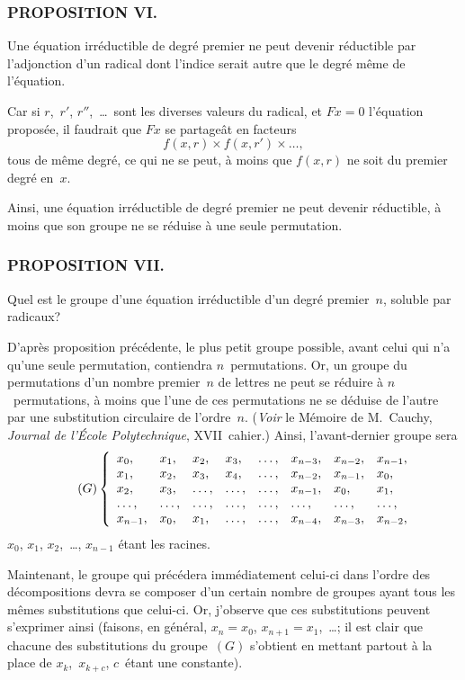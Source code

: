 \documentclass[leqno,12pt]{book}[2005/09/16]
\newcommand{\Subsection}[1]{\subsubsection*{\centering\small\normalfont #1}}
\newenvironment{MyEnvt}[2]{%
  \medskip\par
  \ifthenelse{\equal{#1}{}}{%
    \textsc{#2.}\ --- %
  }{%
    \textsc{#2 #1}\ --- %
  }%
  \itshape\ignorespaces
}{\medskip\normalfont}
\newenvironment{Probleme}[1][]{\begin{MyEnvt}{#1}{Problème}}{\end{MyEnvt}}
\newenvironment{Lemme}[1][]{\begin{MyEnvt}{#1}{Lemme}}{\end{MyEnvt}}
\newcommand{\Eq}[1]{\ensuremath{#1}}
\newcommand{\Tag}[1]{\tag*{\ensuremath{#1}}}
\newcommand{\Title}[1]{\textit{#1}}
\begin{document}
\Subsection{PROPOSITION VI.}

\begin{Lemme}
Une équation irréductible de degré premier ne
peut devenir réductible par l'adjonction d'un radical dont
l'indice serait autre que le degré même de l'équation.
\end{Lemme}

Car si $r$,~$r'$, $r''$,~\dots\ sont les diverses valeurs du radical, et
$Fx = 0$ l'équation proposée, il faudrait que $Fx$ se partageât en
facteurs
\[
f(x,r) × f(x,r') × \dots,
\]
tous de même degré, ce qui ne se peut, à moins que $f(x, r)$ ne
soit du premier degré en~$x$.

Ainsi, une équation irréductible de degré premier ne peut
devenir réductible, à moins que son groupe ne se réduise à une
seule permutation.


\Subsection{PROPOSITION VII.}

\begin{Probleme}
Quel est le groupe d'une équation irréductible
d'un degré premier~$n$, soluble par radicaux?
\end{Probleme}

D'après proposition précédente, le plus petit groupe possible,
avant celui qui n'a qu'une seule permutation, contiendra $n$~permutations.
Or, un groupe du permutations d'un nombre premier~$n$
de lettres ne peut se réduire à $n$~permutations, à moins que
l'une de ces permutations ne se déduise de l'autre par une substitution
circulaire de l'ordre~$n$. (\emph{Voir} le Mémoire de M.~Cauchy,
\Title{Journal de l'École Polytechnique}, XVII\ieme~cahier.) Ainsi, l'avant-dernier
groupe sera
\[
\Tag{(G)}
\left\{
\begin{array}{*{8}{l}}
x_{0},    &x_{1}, &x_{2}, &x_{3}, &\dots, &x_{n-3}, &x_{n-2}, &x_{n-1}, \\
x_{1},    &x_{2}, &x_{3}, &x_{4}, &\dots, &x_{n-2}, &x_{n-1}, &x_{0}, \\
x_{2},    &x_{3}, &\dots, &\dots, &\dots, &x_{n-1}, &x_{0}, &x_{1}, \\
\dots,  &\dots, &\dots, &\dots, &\dots, &\dots, &\dots, &\dots, \\
x_{n-1}, &x_{0}, &x_{1}, &\dots, &\dots, &x_{n-4}, &x_{n-3}, &x_{n-2},
\end{array}
\right.
\]
$x_{0}$, $x_{1}$, $x_{2}$,~\dots, $x_{n-1}$ étant les racines.

Maintenant, le groupe qui précédera immédiatement celui-ci
dans l'ordre des décompositions devra se composer d'un certain
nombre de groupes ayant tous les mêmes substitutions que
celui-ci. Or, j'observe que ces substitutions peuvent s'exprimer
ainsi (faisons, en général, $x_{n} = x_{0}$, $x_{n+1} = x_{1}$,~\dots; il est clair
que chacune des substitutions du groupe~\Eq{(G)} s'obtient en mettant
partout à la place de $x_{k}$,~$x_{k+c}$, $c$~étant une constante).
\end{document}
